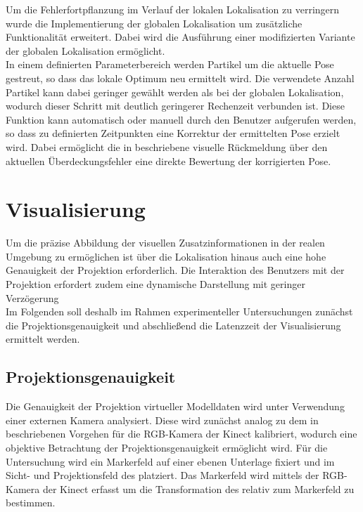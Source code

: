 Um die Fehlerfortpflanzung im Verlauf der lokalen Lokalisation zu verringern wurde die Implementierung der globalen Lokalisation um zusätzliche Funktionalität erweitert. Dabei wird die Ausführung einer modifizierten Variante der globalen Lokalisation ermöglicht.\\
In einem definierten Parameterbereich werden Partikel um die aktuelle Pose gestreut, so dass das lokale Optimum neu ermittelt wird. Die verwendete Anzahl Partikel kann dabei geringer gewählt werden als bei der globalen Lokalisation, wodurch dieser Schritt mit deutlich geringerer Rechenzeit verbunden ist. Diese Funktion kann automatisch oder manuell durch den Benutzer aufgerufen werden, so dass zu definierten Zeitpunkten eine Korrektur der ermittelten Pose erzielt wird. Dabei ermöglicht die in  beschriebene visuelle Rückmeldung über den aktuellen Überdeckungsfehler eine direkte Bewertung der korrigierten Pose.






\section{Visualisierung}
Um die präzise Abbildung der visuellen Zusatzinformationen in der realen Umgebung zu ermöglichen ist über die Lokalisation hinaus auch eine hohe Genauigkeit der Projektion erforderlich. Die Interaktion des Benutzers mit der Projektion erfordert zudem eine dynamische Darstellung mit geringer Verzögerung\\
Im Folgenden soll deshalb im Rahmen experimenteller Untersuchungen zunächst die Projektionsgenauigkeit und abschließend die Latenzzeit der Visualisierung ermittelt werden.

\subsection{Projektionsgenauigkeit}
Die Genauigkeit der Projektion virtueller Modelldaten wird unter Verwendung einer externen Kamera analysiert. Diese wird zunächst analog zu dem in  beschriebenen Vorgehen für die RGB-Kamera der Kinect kalibriert, wodurch eine objektive Betrachtung der Projektionsgenauigkeit ermöglicht wird. Für die Untersuchung wird ein Markerfeld auf einer ebenen Unterlage fixiert und im Sicht- und Projektionsfeld des  platziert. Das Markerfeld wird mittels der RGB-Kamera der Kinect erfasst um die Transformation des  relativ zum Markerfeld zu bestimmen.\\

